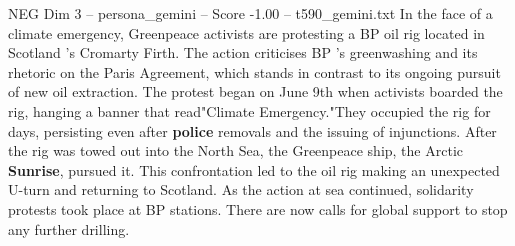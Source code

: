 \begin{textsample}{NEG Dim 3 – persona\_gemini – Score -1.00 – t590\_gemini.txt}  \label{ex:f3_neg_010}
In the face of a climate emergency, Greenpeace activists are protesting a BP oil rig located in Scotland 's Cromarty Firth.
The action criticises BP 's greenwashing and its rhetoric on the Paris Agreement, which stands in contrast to its ongoing pursuit of new oil extraction.
The protest began on June 9th when activists boarded the rig, hanging a banner that read"Climate Emergency."They occupied the rig for days, persisting even after \textbf{police} removals and the issuing of injunctions.
After the rig was towed out into the North Sea, the Greenpeace ship, the Arctic \textbf{Sunrise}, pursued it.
This confrontation led to the oil rig making an unexpected U-turn and returning to Scotland.
As the action at sea continued, solidarity protests took place at BP stations.
There are now calls for global support to stop any further drilling.

\end{textsample}
